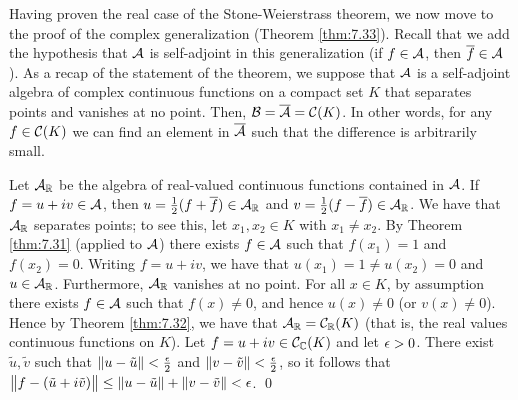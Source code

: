 \noindent Having proven the real case of the Stone-Weierstrass theorem, we now move to the proof of the complex generalization (Theorem \ref{thm:7.33}). Recall that we add the hypothesis that $\mathcal{A}$ is self-adjoint in this generalization (if $f \in \mathcal{A}$, then $\overline{f} \in \mathcal{A}$). As a recap of the statement of the theorem, we suppose that $\mathcal{A}$ is a self-adjoint algebra of complex continuous functions on a compact set $K$ that separates points and vanishes at no point. Then, $\mathcal{B} = \overline{\mathcal{A}} = \mathcal{C}(K)$. In other words, for any $f \in \mathcal{C}(K)$ we can find an element in $\overline{\mathcal{A}}$ such that the difference is arbitrarily small. 

\begin{nproof}
    Let $\mathcal{A}_{\mathbb{R}}$ be the algebra of real-valued continuous functions contained in $\mathcal{A}$. If $f = u + iv \in \mathcal{A}$, then $u = \frac{1}{2}(f + \overline{f}) \in \mathcal{A}_{\mathbb{R}}$ and $v = \frac{1}{2}(f - \overline{f}) \in \mathcal{A}_{\mathbb{R}}$. We have that $\mathcal{A}_{\mathbb{R}}$ separates points; to see this, let $x_1, x_2 \in K$ with $x_1 \neq x_2$. By Theorem \ref{thm:7.31} (applied to $\mathcal{A}$) there exists $f \in \mathcal{A}$ such that $f(x_1) = 1$ and $f(x_2) = 0$. Writing $f = u + iv$, we have that $u(x_1) = 1 \neq u(x_2) = 0$ and $u \in \mathcal{A}_{\mathbb{R}}$. Furthermore, $\mathcal{A}_{\mathbb{R}}$ vanishes at no point. For all $x \in K$, by assumption there exists $f \in \mathcal{A}$ such that $f(x) \neq 0$, and hence $u(x) \neq 0$ (or $v(x) \neq 0$). Hence by Theorem \ref{thm:7.32}, we have that $\mathcal{A}_{\mathbb{R}} = \mathcal{C}_{\mathbb{R}}(K)$ (that is, the real values continuous functions on $K$). Let $f = u + iv \in \mathcal{C}_{\mathbb{C}}(K)$ and let $\epsilon > 0$. There exist $\tilde{u}, \tilde{v}$ such that $\norm{u - \tilde{u}} < \frac{\epsilon}{2}$ and $\norm{v - \tilde{v}} < \frac{\epsilon}{2}$, so it follows that $\norm{f - (\tilde{u} + i\tilde{v})} \leq \norm{u - \tilde{u}} + \norm{v - \tilde{v}} < \epsilon$. \qed
\end{nproof}